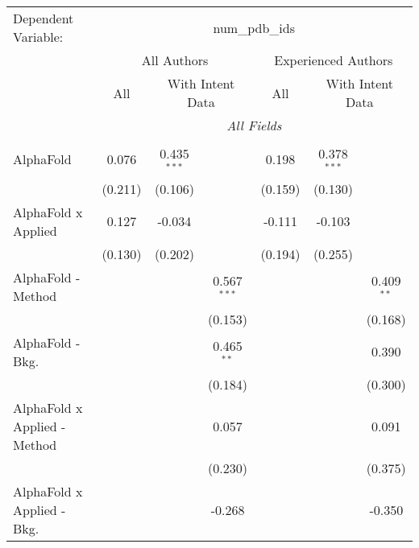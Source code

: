 \begingroup
\centering
\begin{tabular}{lcccccc}
   \tabularnewline \midrule \midrule
   Dependent Variable: & \multicolumn{6}{c}{num\_pdb\_ids}\\
 & \multicolumn{3}{c}{All Authors} & \multicolumn{3}{c}{Experienced Authors} \\
\cmidrule(lr){2-4} \cmidrule(lr){5-7}
 & \multicolumn{1}{c}{All} & \multicolumn{2}{c}{With Intent Data} & \multicolumn{1}{c}{All} & \multicolumn{2}{c}{With Intent Data} \\
\cmidrule(lr){2-2} \cmidrule(lr){3-4} \cmidrule(lr){5-5} \cmidrule(lr){6-7}
 & \multicolumn{6}{c}{\textit{All Fields}} \\ \\
   AlphaFold                      & 0.076        & 0.435$^{***}$ &               & 0.198         & 0.378$^{***}$  &   \\   
                                  & (0.211)      & (0.106)       &               & (0.159)       & (0.130)        &   \\   
   AlphaFold x Applied            & 0.127        & -0.034        &               & -0.111        & -0.103         &   \\   
                                  & (0.130)      & (0.202)       &               & (0.194)       & (0.255)        &   \\   
   AlphaFold - Method             &              &               & 0.567$^{***}$ &               &                & 0.409$^{**}$\\   
                                  &              &               & (0.153)       &               &                & (0.168)\\   
   AlphaFold - Bkg.               &              &               & 0.465$^{**}$  &               &                & 0.390\\   
                                  &              &               & (0.184)       &               &                & (0.300)\\   
   AlphaFold x Applied - Method   &              &               & 0.057         &               &                & 0.091\\   
                                  &              &               & (0.230)       &               &                & (0.375)\\   
   AlphaFold x Applied - Bkg.     &              &               & -0.268        &               &                & -0.350\\   

\end{tabular}
